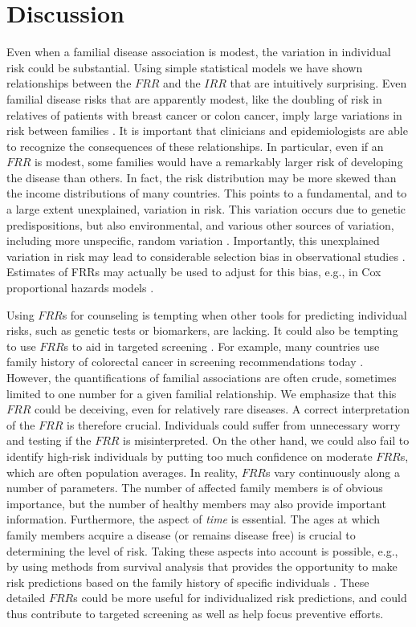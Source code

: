 \documentclass{bmcart}
\begin{document}
\section*{Discussion}
\label{sec:4}
Even when a familial disease association is modest, the variation in individual risk could be substantial. Using simple statistical models we have shown relationships between the $FRR$ and the $IRR$ that are intuitively surprising. Even familial disease risks that are apparently modest, like the doubling of risk in relatives of patients with breast cancer or colon cancer, imply large variations in risk between families \cite{byrnes2008so,hopper2011disease}. It is important that clinicians and epidemiologists are able to recognize the consequences of these relationships. In particular, even if an $FRR$ is modest, some families would have a remarkably larger risk of developing the disease than others. In fact, the risk distribution may be more skewed than the income distributions of many countries. This points to a fundamental, and to a large extent unexplained, variation in risk. This variation occurs due to genetic predispositions, but also environmental, and various other sources of variation, including more unspecific, random variation \cite{aalen2014understanding}. Importantly, this unexplained variation in risk may lead to considerable selection bias in observational studies \cite{stensrud2017a,stensrud2017b}. Estimates of FRRs may actually be used to adjust for this bias, e.g., in Cox proportional hazards models \cite{stensrud2017handling}.  

Using $FRR$s for counseling is tempting when other tools for predicting individual risks, such as genetic tests or biomarkers, are lacking. It could also be tempting to use $FRR$s to aid in targeted screening \cite{hemminki2014collection,frank2015population}. For example, many countries use family history of colorectal cancer in screening recommendations today \cite{win2014risk}. However, the quantifications of familial associations are often crude, sometimes limited to one number for a given familial relationship. We emphasize that this $FRR$ could be deceiving, even for relatively rare diseases. A correct interpretation of the $FRR$ is therefore crucial. Individuals could suffer from unnecessary worry and testing if the $FRR$ is misinterpreted. On the other hand, we could also fail to identify high-risk individuals by putting too much confidence on moderate $FRR$s, which are often population averages. In reality, $FRR$s vary continuously along a number of parameters. The number of affected family members is of obvious importance, but the number of healthy members may also provide important information. Furthermore, the aspect of \textit{time} is essential. The ages at which family members acquire a disease (or remains disease free) is crucial to determining the level of risk. Taking these aspects into account is possible, e.g., by using methods from survival analysis that provides the opportunity to make risk predictions based on the family history of specific individuals \cite{moger2011hierarchical,valberg2014hierarchical,ABG}. These detailed $FRR$s could be more useful for individualized risk predictions, and could thus contribute to targeted screening as well as help focus preventive efforts.
\end{document}

